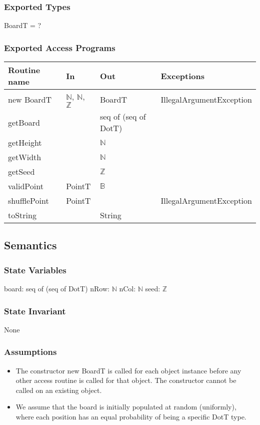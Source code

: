 \documentclass[12pt]{article}
\begin{document}
\subsubsection* {Exported Types}
BoardT = ?

\subsubsection* {Exported Access Programs}
\begin{tabular}{| l | l | l | l |}
\hline
\textbf{Routine name} & \textbf{In} & \textbf{Out} & \textbf{Exceptions}\\
\hline
new BoardT & $\mathbb{N}$, $\mathbb{N}$, $\mathbb{Z}$ & BoardT & IllegalArgumentException \\
\hline
getBoard & ~ & seq of (seq of DotT) & \\
\hline
getHeight & ~ & $\mathbb{N}$ & \\
\hline
getWidth & ~ & $\mathbb{N}$ & \\
\hline
getSeed & ~ & $\mathbb{Z}$ & \\
\hline
validPoint & PointT & $\mathbb{B}$ & \\
\hline
shufflePoint & PointT & ~ & IllegalArgumentException \\
\hline
toString & ~ & String & \\
\hline
\end{tabular}


\subsection* {Semantics}
\subsubsection* {State Variables}
board: seq of (seq of DotT)
nRow: $\mathbb{N}$
nCol: $\mathbb{N}$
seed: $\mathbb{Z}$

\subsubsection* {State Invariant}
None

\subsubsection* {Assumptions}
\begin{itemize}
    \item The constructor new BoardT is called for each object instance before
    any other access routine is called for that object.  The constructor cannot
    be called on an existing object.

    \item We assume that the board is initially populated at random (uniformly),
    where each position has an equal probability of being a specific DotT type.
\end{itemize}
\end{document}
